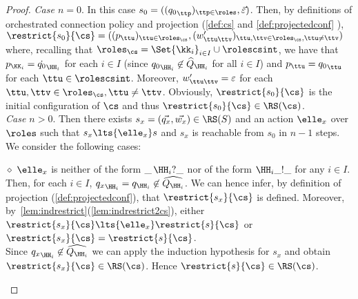 \begin{proof}
{\em Case $n=0$}. 
In this case $s_0 = (({q_0}_{\ttp})_{\ttp\in\roles},\vec{\varepsilon})$.
Then, by definitions of orchestrated connection policy  %
and projection (\cref{def:cs} and \cref{def:projectedconf} ),
$\restrict{s_0}{\cs} = (({p}_{\ttu})_{\ttu \in \roles_{\cs}},(w'_{\ttu\ttv})_{\ttu,\ttv\in \roles_{\cs},\ttu\neq\ttv})$
where, recalling that $\roles_{\cs}=\Set{\kk_i}_{i\in I}\cup\rolescsint$, we have that ${p}_{\KK_i} = \dot{q_0}_{\HH_i}$ for each $i\in I$ (since ${q_0}_{\HH_i}\not\in \widehat Q_{\HH_i}$ for all $i \in I$) and  ${p}_{\ttu} = {q_0}_{\ttu}$ for each $\ttu\in \rolescsint$.
Moreover, $w'_{\ttu\ttv} = %
\varepsilon$ for each $\ttu,\ttv \in \roles_{\cs},\ttu\neq\ttv$.
Obviously, $\restrict{s_0}{\cs}$ is the initial configuration of $\cs$
and thus $\restrict{s_0}{\cs}\in \RS(\cs)$.\\
{\em Case $n>0$}.
Then there exists $s_x = (\vec{q_x},\vec{w_x}) \in \RS(S)$ and an action $\elle_x$ over $\roles$
such that $s_x\lts{\elle_x}s$ and $s_x$ is reachable from $s_0$ in $n-1$ steps. We consider the following cases:

\begin{description}
%
\item

\underline{$\diamond$}
$\elle_x$ is neither of the form $\_\,\HH_i?\_$ nor of the form $\HH_i\_!\_$ for any $i\in I$.\\
Then, for each $i\in I$, ${q_x}_{\HH_i}={q}_{\HH_i}\not\in\widehat{Q_{\HH_i}}$.
We can hence infer, by definition of projection (\cref{def:projectedconf}), 
that $\restrict{s_x}{\cs}$ is defined.
Moreover, by~\cref{lem:indrestrict}(\ref{lem:indrestrict2cs}),
either $\restrict{s_x}{\cs}\lts{\elle_x}\restrict{s}{\cs}$ or  $\restrict{s_x}{\cs}=\restrict{s}{\cs}$.\\
Since ${q_x}_{\HH_i}\not\in\widehat{Q_{\HH_i}}$ we can apply the induction hypothesis for $s_x$ and obtain $\restrict{s_x}{\cs}\in \RS(\cs)$.
Hence $\restrict{s}{\cs}\in \RS(\cs)$.

%
\item


\end{description}
\end{proof}
